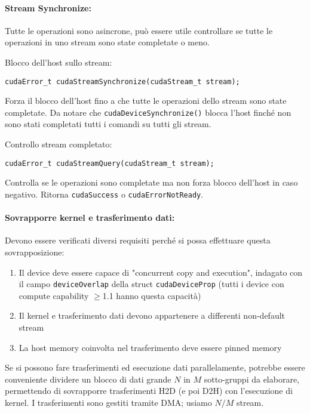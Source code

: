 \paragraph{Stream Synchronize:} Tutte le operazioni sono asincrone, può essere utile controllare se tutte le operazioni in uno stream sono state completate o meno.

Blocco dell'host sullo stream: 
\begin{verbatim}
cudaError_t cudaStreamSynchronize(cudaStream_t stream);
\end{verbatim}

Forza il blocco dell'host fino a che tutte le operazioni dello stream sono state completate. Da notare che \texttt{cudaDeviceSynchronize()} blocca l'host finché non sono stati completati tutti i comandi su tutti gli stream.

Controllo stream completato:
\begin{verbatim}
cudaError_t cudaStreamQuery(cudaStream_t stream);
\end{verbatim}

Controlla se le operazioni sono completate ma non forza blocco dell'host in caso negativo. Ritorna \texttt{cudaSuccess} o \texttt{cudaErrorNotReady}.

\paragraph{Sovrapporre kernel e trasferimento dati:} Devono essere verificati diversi requisiti perché si possa effettuare questa sovrapposizione:
\begin{enumerate}
	\item Il device deve essere capace di "concurrent copy and execution", indagato con il campo \texttt{deviceOverlap} della struct \texttt{cudaDeviceProp} (tutti i device con compute capability $\geq$1.1 hanno questa capacità)

	\item Il kernel e trasferimento dati devono appartenere a differenti non-default stream

	\item La host memory coinvolta nel trasferimento deve essere pinned memory
\end{enumerate}

Se si possono fare trasferimenti ed esecuzione dati parallelamente, potrebbe essere conveniente dividere un blocco di dati grande $N$ in $M$ sotto-gruppi da elaborare, permettendo di sovrapporre trasferimenti H2D (e poi D2H) con l'esecuzione di kernel. I trasferimenti sono gestiti tramite DMA; usiamo $N/M$ stream.

